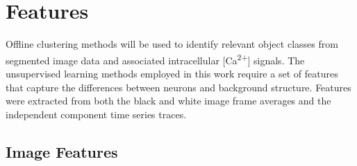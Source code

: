 \documentclass[11pt]{article}
\newcommand{\calcium}[0]{Ca\textsuperscript{2+}}
\begin{document}
\section{Features}

Offline clustering methods will be used to identify relevant object classes from segmented image data and associated intracellular [\calcium] signals.
The unsupervised learning methods employed in this work require a set of features that capture the differences between neurons and background structure. 
Features were extracted from both the black and white image frame averages and the independent component time series traces.

\subsection{Image Features}
\end{document}
